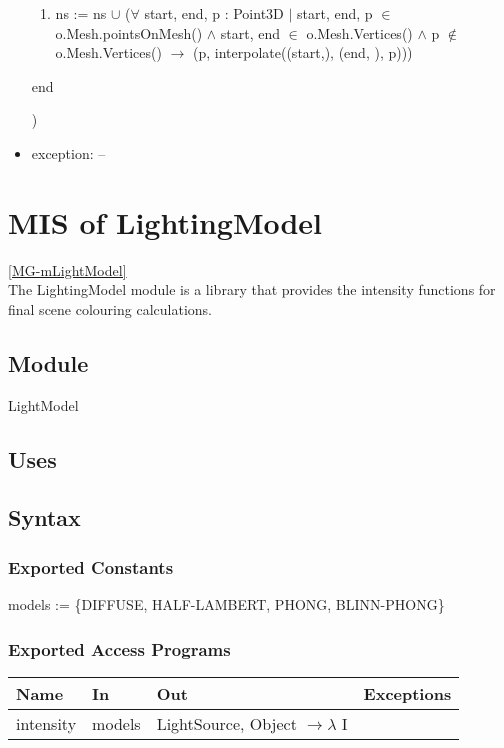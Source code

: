 \documentclass[12pt, titlepage]{article}
\begin{document}
\begin{itemize}
{\begin{enumerate}
		\textit{begin:}
		\begin{itemize}
			\item[] sum:= +(p.s\_norm) --- \textit{Add the surface norms 
				together}.
			\item[] counter++ --- \textit{Count how many polygons are a part of 
				this}.
		\end{itemize}
		\textit{end} $\to$ (v, sum/counter))
		\item ns := ns $\cup$ ($\forall$ start, end, p : Point3D $|$ start, 
		end, p $\in$ o.Mesh.pointsOnMesh() $\land$ start, end $\in$ 
		o.Mesh.Vertices() $\land$ p $\notin$ o.Mesh.Vertices() $\to$ (p,
		interpolate((start,), (end, ), p)))
	\end{enumerate}
	end\\}
	)
	
	\item exception: -- \\
\end{itemize}

\section{MIS of LightingModel} \ref{MG-mLightModel} \\
The LightingModel module is a library that provides the intensity functions for 
final scene colouring calculations.
\subsection{Module}
LightModel

\subsection{Uses}

\subsection{Syntax}
\subsubsection{Exported Constants}
models := \{DIFFUSE, HALF-LAMBERT, PHONG, BLINN-PHONG\}
\subsubsection{Exported Access Programs}
\begin{center}
	\begin{tabular}{p{3cm} p{4cm} p{2cm} p{4cm}}
		\hline
		\textbf{Name} & \textbf{In} & \textbf{Out} & \textbf{Exceptions} \\
		\hline
		intensity & models & LightSource, Object $\to \lambda$ I & \\
		\hline
	\end{tabular}
\end{center}
\end{document}
